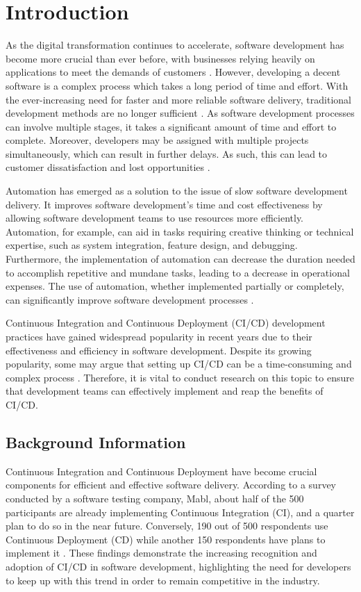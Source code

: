 \chapter{Introduction}

As the digital transformation continues to accelerate, software development has become more crucial than ever before, with businesses relying heavily on applications to meet the demands of customers \cite{hf}. However, developing a decent software is a complex process which takes a long period of time and effort. With the ever-increasing need for faster and more reliable software delivery, traditional development methods are no longer sufficient \cite{dsmgm}. As software development processes can involve multiple stages, it takes a significant amount of time and effort to complete. Moreover, developers may be assigned with multiple projects simultaneously, which can result in further delays. As such, this can lead to customer dissatisfaction and lost opportunities \cite{sb}.

Automation has emerged as a solution to the issue of slow software development delivery. It improves software development's time and cost effectiveness by allowing software development teams to use resources more efficiently. Automation, for example, can aid in tasks requiring creative thinking or technical expertise, such as system integration, feature design, and debugging. Furthermore, the implementation of automation can decrease the duration needed to accomplish repetitive and mundane tasks, leading to a decrease in operational expenses. The use of automation, whether implemented partially or completely, can significantly improve software development processes \cite{saarenpaa2020creating}.

Continuous Integration and Continuous Deployment (CI/CD) development practices have gained widespread popularity in recent years due to their effectiveness and efficiency in software development. Despite its growing popularity, some may argue that setting up CI/CD can be a time-consuming and complex process \cite{sander}. Therefore, it is vital to conduct research on this topic to ensure that development teams can effectively implement and reap the benefits of CI/CD.

\section{Background Information}

Continuous Integration and Continuous Deployment have become crucial components for efficient and effective software delivery. According to a survey conducted by a software testing company, Mabl, about half of the 500 participants are already implementing Continuous Integration (CI), and a quarter plan to do so in the near future. Conversely, 190 out of 500 respondents use Continuous Deployment (CD) while another 150 respondents have plans to implement it \cite{clark}. These findings demonstrate the increasing recognition and adoption of CI/CD in software development, highlighting the need for developers to keep up with this trend in order to remain competitive in the industry.

